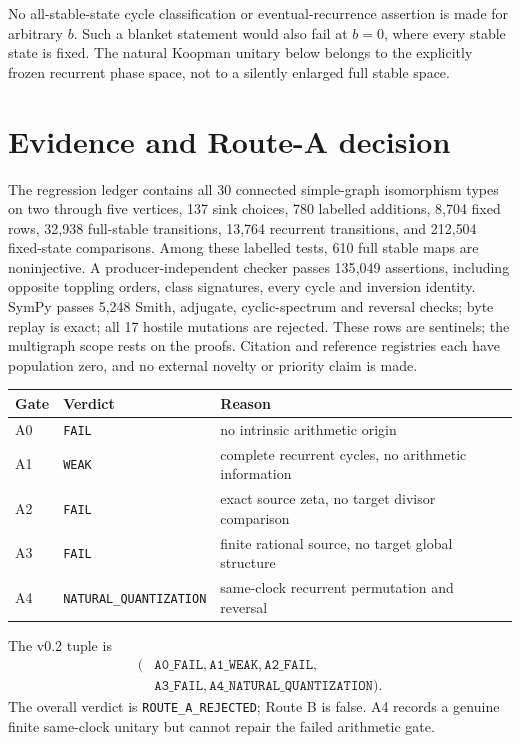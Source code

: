 \documentclass[10pt]{article}
\begin{document}
No all-stable-state cycle classification or eventual-recurrence assertion is
made for arbitrary $b$. Such a blanket statement would also fail at $b=0$,
where every stable state is fixed. The natural Koopman unitary below belongs
to the explicitly frozen recurrent phase space, not to a silently enlarged
full stable space.

\section{Evidence and Route-A decision}
The regression ledger contains all 30 connected simple-graph isomorphism
types on two through five vertices, 137 sink choices, 780 labelled additions,
8{,}704 fixed rows, 32{,}938 full-stable transitions, 13{,}764 recurrent
transitions, and 212{,}504 fixed-state comparisons. Among these labelled
tests, 610 full stable maps are noninjective. A producer-independent checker
passes 135{,}049 assertions, including opposite toppling orders, class
signatures, every cycle and inversion identity. SymPy passes 5{,}248 Smith,
adjugate, cyclic-spectrum and reversal checks; byte replay is exact; all 17
hostile mutations are rejected. These rows are sentinels; the multigraph
scope rests on the proofs. Citation and reference registries each have
population zero, and no external novelty or priority claim is made.

\begin{center}
\small
\begin{tabular}{lll}
\toprule
Gate&Verdict&Reason\\
\midrule
A0&\texttt{FAIL}&no intrinsic arithmetic origin\\
A1&\texttt{WEAK}&complete recurrent cycles, no arithmetic information\\
A2&\texttt{FAIL}&exact source zeta, no target divisor comparison\\
A3&\texttt{FAIL}&finite rational source, no target global structure\\
A4&\texttt{NATURAL\_QUANTIZATION}&same-clock recurrent permutation and reversal\\
\bottomrule
\end{tabular}
\end{center}
The v0.2 tuple is
\[
\begin{aligned}
(&\texttt{A0\_FAIL},\texttt{A1\_WEAK},\texttt{A2\_FAIL},\\
 &\texttt{A3\_FAIL},\texttt{A4\_NATURAL\_QUANTIZATION}).
\end{aligned}
\]
The overall verdict is \texttt{ROUTE\_A\_REJECTED}; Route B is false. A4
records a genuine finite same-clock unitary but cannot repair the failed
arithmetic gate.
\end{document}
